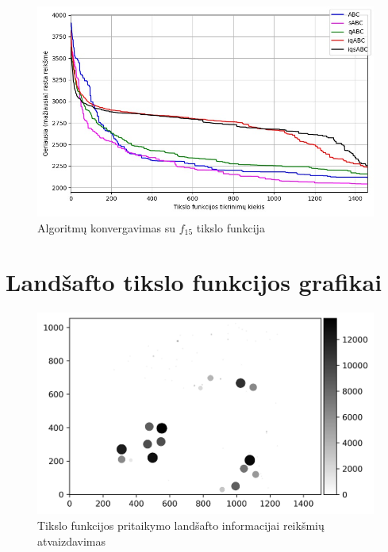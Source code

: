 \documentclass{VUMIFKompMagistrinis}
\begin{document}
\begin{landscape}
\begin{figure}[H]
    \centering
    \includegraphics[scale=0.45]{img/2kv/all_f15.jpg}
    \caption{Algoritmų konvergavimas su $f_{15}$ tikslo funkcija}
    \label{img:konf15}
\end{figure}


\end{landscape}





\section{Landšafto tikslo funkcijos grafikai}\label{PR4goal}

\begin{figure}[H]
    \centering
    \includegraphics[scale=0.8]{img/new/fitres.png}
    \caption{Tikslo funkcijos pritaikymo landšafto informacijai reikšmių atvaizdavimas}
    \label{mapgoalpic}
\end{figure}
\end{document}

